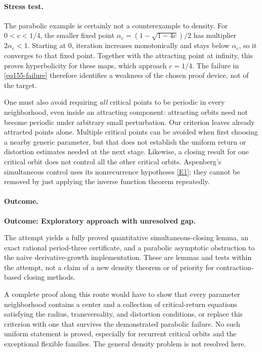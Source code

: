\documentclass[11pt,a4paper]{article}
\newcommand{\eref}[2]{\hyperlink{extra:#1:#2}{[E#2]}}
\numberwithin{equation}{section}
\begin{document}
\paragraph{Stress test.}
The parabolic example is certainly not a counterexample to density. For
$0<c<1/4$, the smaller fixed point
$\alpha_c=(1-\sqrt{1-4c})/2$ has multiplier $2\alpha_c<1$.
Starting at $0$, iteration increases monotonically and stays below
$\alpha_c$, so it converges to that fixed point. Together with the
attracting point at infinity, this proves hyperbolicity for these maps,
which approach $c=1/4$. The failure in \eqref{eq155-failure} therefore
identifies a weakness of the chosen proof device, not of the target.

One must also avoid requiring \emph{all} critical points to be periodic in
every neighborhood, even inside an attracting component: attracting
orbits need not become periodic under arbitrary small perturbation. Our
criterion leaves already attracted points alone. Multiple critical points
can be avoided when first choosing a nearby generic parameter, but that
does not establish the uniform return or distortion estimates needed at
the next stage. Likewise, a closing result for one critical orbit does not
control all the other critical orbits. Aspenberg's simultaneous control
uses its nonrecurrence hypotheses \eref{statement}{1}; they cannot be removed
by just applying the inverse function theorem repeatedly.

\paragraph{Outcome.}
\textbf{Outcome: Exploratory approach with unresolved gap.}

The attempt yields a fully proved quantitative simultaneous-closing lemma,
an exact rational period-three certificate, and a parabolic asymptotic
obstruction to the naive derivative-growth implementation. These are
lemmas and tests within the attempt, not a claim of a new density theorem
or of priority for contraction-based closing methods.

A complete proof along this route would have to show that every parameter
neighborhood contains a center and a collection of critical-return equations
satisfying the radius, transversality, and distortion conditions, or replace
this criterion with one that survives the demonstrated parabolic failure.
No such uniform statement is proved, especially for recurrent critical
orbits and the exceptional flexible families. The general density problem
is not resolved here.
\end{document}
